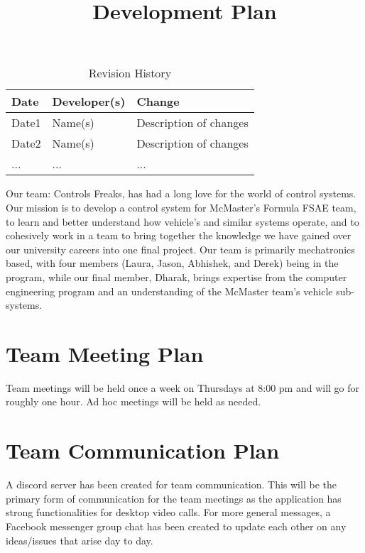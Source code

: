 \documentclass{article}
\title{Development Plan\\\progname}
\author{\authname}
\date{}
\begin{document}
\begin{table}[hp]
\caption{Revision History} \label{TblRevisionHistory}
\begin{tabularx}{\textwidth}{llX}
\toprule
\textbf{Date} & \textbf{Developer(s)} & \textbf{Change}\\
\midrule
Date1 & Name(s) & Description of changes\\
Date2 & Name(s) & Description of changes\\
... & ... & ...\\
\bottomrule
\end{tabularx}
\end{table}

\newpage

\maketitle

Our team: Controls Freaks, has had a long love for 
the world of control systems. Our mission is to develop 
a control system for McMaster’s Formula FSAE team, to learn 
and better understand how vehicle’s and similar systems operate, 
and to cohesively work in a team to bring together the knowledge 
we have gained over our university careers into one final project. 
Our team is primarily mechatronics based, with four members 
(Laura, Jason, Abhishek, and Derek) being in the program, while 
our final member, Dharak, brings expertise from the computer engineering 
program and an understanding of the McMaster team's vehicle sub-systems.

\section{Team Meeting Plan}
Team meetings will be held once a week on 
Thursdays at 8:00 pm and will go for roughly 
one hour. Ad hoc meetings will be held as needed.

\section{Team Communication Plan}

A discord server has been created for team communication. This will be 
the primary form of communication for the team meetings as the application 
has strong functionalities for desktop video calls. For more general messages, 
a Facebook messenger group chat has been created to update each other on any 
ideas/issues that arise day to day.
\end{document}
